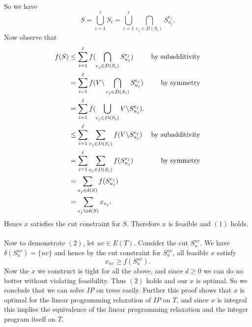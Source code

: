 \documentclass[letterpaper,12pt,oneside,onecolumn]{article}
\begin{document}
\paragraph{}
So we have $$S = \bigcup_{i=1}^\ell S_i = \bigcup_{i=1}^\ell \bigcap_{e_j \in D(S_i)}S^{e_j}_{u_j}.$$ Now observe that
\begin{align*}
f(S) &\leq \sum_{i=1}^\ell f(\bigcap_{e_j \in D(S_i)}S^{e_j}_{u_j}) &\text{by subadditivity} \\
&= \sum_{i=1}^\ell f(V\backslash \bigcap_{e_j \in D(S_i)} S^{e_j}_{u_j}) &\text{by symmetry} \\
&= \sum_{i=1}^\ell f(\bigcup_{e_j\in D(S_i)} V\backslash S^{e_j}_{u_j}). \\
&\leq \sum_{i=1}^\ell \sum_{e_j \in D(S_i)} f(V\backslash S^{e_j}_{u_j}) &\text{by subadditivity} \\ 
&= \sum_{i=1}^\ell \sum_{e_j \in D(S_i)} f(S^{e_j}_{u_j}) &\text{by symmetry} \\
&= \sum_{e_j \in \delta(S)} f(S^{e_j}_{u_j}) \\
&= \sum_{e_j \i \delta(S)} x_{e_j}.
\end{align*}
Hence $x$ satisfies the cut constraint for $S$. Therefore $x$ is feasible and $(1)$ holds.
\paragraph{}
Now to demonstrate $(2)$, let $uv \in E(T)$. Consider the cut $S^{uv}_u$. We have $\delta(S^{uv}_u) = \{uv\}$ and hence by the cut constraint for $S^{uv}_u$, all feasible $x$ satisfy
$$x_{uv} \geq f(S^{uv}_u).$$
Now the $x$ we construct is tight for all the above, and since $d \geq 0$ we can do no better without violating feasibility. Thus $(2)$ holds and our $x$ is optimal. So we conclude that we can solve $IP$ on trees easily. Further this proof shows that $x$ is optimal for the linear programming relaxation of $IP$ on $T$, and since $x$ is integral this implies the equivalence of the linear programming relaxation and the integer program itself on $T$.
\end{document}
